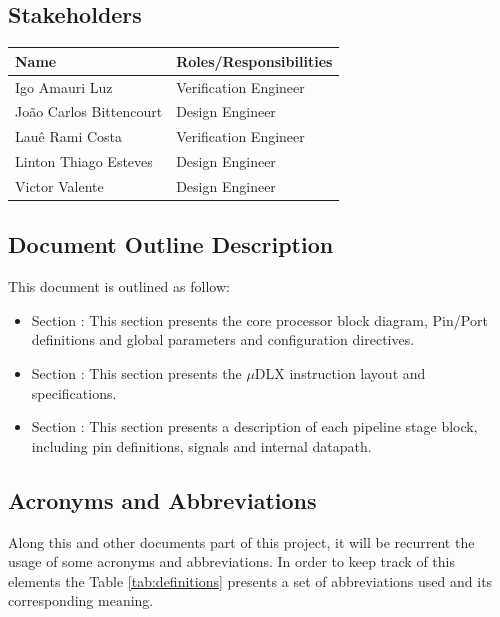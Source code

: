 \documentclass{article}
\begin{document}
  \subsection{Stakeholders}
  \FloatBarrier
  \begin{table}[H] 
    \begin{center}
      \begin{tabular}[pos]{|m{5cm} | m{8cm}|} 
        \hline %
        \cellcolor[gray]{0.9}\textbf{Name} & \cellcolor[gray]{0.9}\textbf{Roles/Responsibilities} \\ \hline
        Igo Amauri Luz & Verification Engineer \\ \hline
        João Carlos Bittencourt & Design Engineer \\ \hline  
        Lauê Rami Costa & Verification Engineer \\ \hline
        Linton Thiago Esteves & Design Engineer \\ \hline  
        Victor Valente & Design Engineer \\ \hline
      \end{tabular}
    \end{center}
  \end{table}    
  
  \subsection{Document Outline Description}
  This document is outlined as follow:
	
	\begin{itemize}
	  \item Section \color{black}{\ref{sec:architecture_overview}}: This section presents the core processor block diagram, Pin/Port definitions and global parameters and configuration directives.
	  \item Section \color{black}{\ref{sec:instruction_layout}}: This section presents the $\mu$DLX instruction layout and specifications. 
    \item Section \color{black}{\ref{sec:architecture_description}}: This section presents a description of each pipeline stage block, including pin definitions, signals and internal datapath.
	\end{itemize}
		
  \subsection{Acronyms and Abbreviations}
  Along this and other documents part of this project, it will be recurrent the usage of some acronyms and abbreviations. In order to keep track of this elements the Table \ref{tab:definitions} presents a set of abbreviations used and its corresponding meaning.
  
\end{document}
